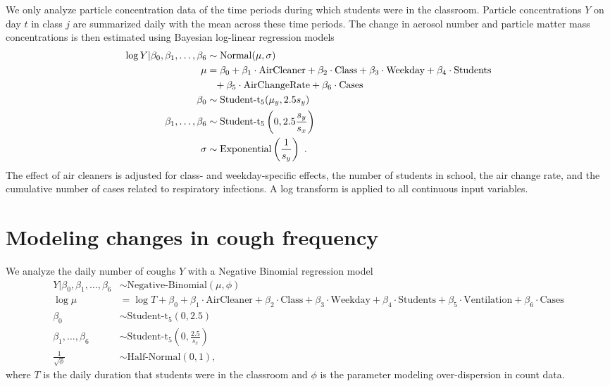 \documentclass[fleqn,11pt]{wlscirep_supp}
\begin{document}
We only analyze particle concentration data of the time periods during which students were in the classroom. Particle concentrations $Y$ on day $t$ in class $j$ are summarized daily with the mean across these time periods. The change in aerosol number and particle matter mass concentrations is then estimated using Bayesian log-linear regression models
\begin{align*}
    \log Y | \beta_0, \beta_1, \dots, \beta_6 &\sim \text{Normal}(\mu,\sigma) \\
    \mu &= \beta_0 + \beta_1 \cdot \text{AirCleaner} + \beta_2 \cdot \text{Class} + \beta_3 \cdot \text{Weekday} + \beta_4 \cdot \text{Students} \\
    &\hphantom{= } + \beta_5 \cdot \text{AirChangeRate} + \beta_6 \cdot \text{Cases} \\
    \beta_0 &\sim \text{Student-t}_5(\mu_y, 2.5s_{y}) \\
    \beta_1, \dots, \beta_6 &\sim \text{Student-t}_5\left(0, 2.5\frac{s_{y}}{s_{x}}\right) \\
    \sigma &\sim \text{Exponential}\left(\frac{1}{s_{y}}\right)~.
\end{align*}
The effect of air cleaners is adjusted for class- and weekday-specific effects, the number of students in school, the air change rate, and the cumulative number of cases related to respiratory infections. A log transform is applied to all continuous input variables. 

\clearpage

\section{Modeling changes in cough frequency}\label{sec:aud-regression-model}

We analyze the daily number of coughs $Y$ with a Negative Binomial regression model
\begin{align*}
    Y | \beta_0, \beta_1, \dots, \beta_6 &\sim \text{Negative-Binomial}(\mu,\phi) \\
    \log \mu &= \log T + \beta_0 + \beta_1 \cdot \text{AirCleaner} + \beta_2 \cdot \text{Class} + \beta_3 \cdot \text{Weekday} + \beta_4 \cdot \text{Students} + \beta_5 \cdot \text{Ventilation} + \beta_6 \cdot \text{Cases} \\
    \beta_0 &\sim \text{Student-t}_5(0, 2.5) \\
    \beta_1, \dots, \beta_6 &\sim \text{Student-t}_5\left(0, \frac{2.5}{s_{x}}\right) \\
    \frac{1}{\sqrt{\phi}} &\sim \text{Half-Normal}(0,1),
\end{align*}
where $T$ is the daily duration that students were in the classroom and $\phi$ is the parameter modeling over-dispersion in count data. 
\end{document}
